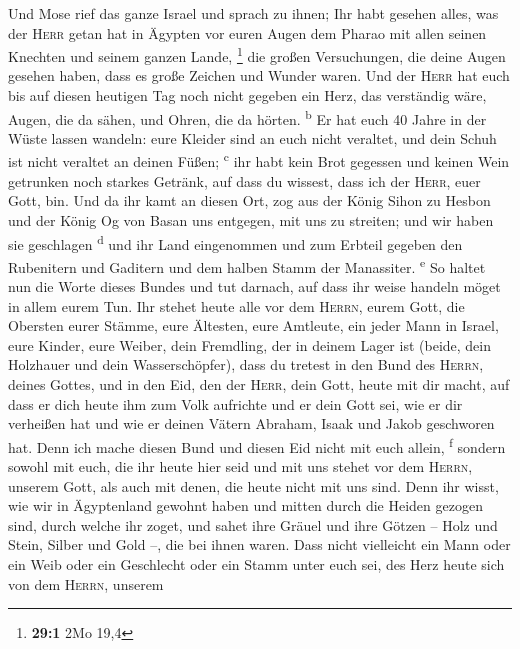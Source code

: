 Und Mose rief das ganze Israel und sprach zu ihnen; Ihr
habt gesehen alles, was der \textsc{Herr} getan hat in Ägypten vor euren
Augen dem Pharao mit allen seinen Knechten und seinem ganzen Lande,
\footnote{\textbf{29:1} 2Mo 19,4}  die großen
Versuchungen, die deine Augen gesehen haben, dass es große Zeichen und
Wunder waren.  Und der \textsc{Herr} hat euch bis auf
diesen heutigen Tag noch nicht gegeben ein Herz, das verständig wäre,
Augen, die da sähen, und Ohren, die da hörten. \textsuperscript{b}
 Er hat euch 40 Jahre in der Wüste lassen wandeln: eure
Kleider sind an euch nicht veraltet, und dein Schuh ist nicht veraltet
an deinen Füßen; \textsuperscript{c}  ihr habt kein Brot
gegessen und keinen Wein getrunken noch starkes Getränk, auf dass du
wissest, dass ich der \textsc{Herr}, euer Gott, bin.  Und
da ihr kamt an diesen Ort, zog aus der König Sihon zu Hesbon und der
König Og von Basan uns entgegen, mit uns zu streiten; und wir haben sie
geschlagen \textsuperscript{d}  und ihr Land eingenommen
und zum Erbteil gegeben den Rubenitern und Gaditern und dem halben Stamm
der Manassiter. \textsuperscript{e}  So haltet nun die
Worte dieses Bundes und tut darnach, auf dass ihr weise handeln möget in
allem eurem Tun.  Ihr stehet heute alle vor dem
\textsc{Herrn}, eurem Gott, die Obersten eurer Stämme, eure Ältesten,
eure Amtleute, ein jeder Mann in Israel,  eure Kinder,
eure Weiber, dein Fremdling, der in deinem Lager ist (beide, dein
Holzhauer und dein Wasserschöpfer),  dass du tretest in
den Bund des \textsc{Herrn}, deines Gottes, und in den Eid, den der
\textsc{Herr}, dein Gott, heute mit dir macht,  auf dass
er dich heute ihm zum Volk aufrichte und er dein Gott sei, wie er dir
verheißen hat und wie er deinen Vätern Abraham, Isaak und Jakob
geschworen hat.  Denn ich mache diesen Bund und diesen
Eid nicht mit euch allein, \textsuperscript{f}  sondern
sowohl mit euch, die ihr heute hier seid und mit uns stehet vor dem
\textsc{Herrn}, unserem Gott, als auch mit denen, die heute nicht mit
uns sind.  Denn ihr wisst, wie wir in Ägyptenland gewohnt
haben und mitten durch die Heiden gezogen sind, durch welche ihr zoget,
 und sahet ihre Gräuel und ihre Götzen -- Holz und Stein,
Silber und Gold --, die bei ihnen waren.  Dass nicht
vielleicht ein Mann oder ein Weib oder ein Geschlecht oder ein Stamm
unter euch sei, des Herz heute sich von dem \textsc{Herrn}, unserem
